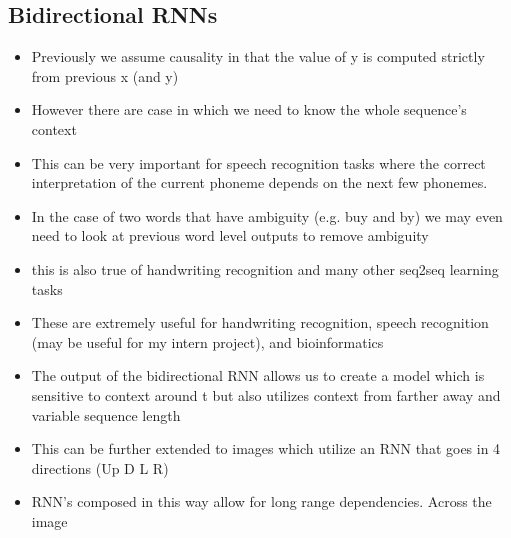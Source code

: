 \documentclass[11pt]{article}
\begin{document}
\subsection{Bidirectional RNNs}
\label{sec:orgef3b478}
\begin{itemize}
\item Previously we assume causality in that the value of y is computed strictly from previous x (and y)
\item However there are case in which we need to know the whole sequence's context
\item This can be very important for speech recognition tasks where the correct interpretation of the current phoneme depends on the next few phonemes.
\item In the case of two words that have ambiguity (e.g. buy and by) we may even need to look at previous word level outputs to remove ambiguity
\item this is also true of handwriting recognition and many other seq2seq learning tasks
\item These are extremely useful for handwriting recognition, speech recognition (may be useful for my intern project), and bioinformatics
\item The output of the bidirectional RNN allows us to create a model which is sensitive to context around t but also utilizes context from farther away and variable sequence length
\item This can be further extended to images which utilize an RNN that goes in 4 directions (Up D L R)
\item RNN's composed in this way allow for long range dependencies. Across the image
\end{itemize}
\end{document}
